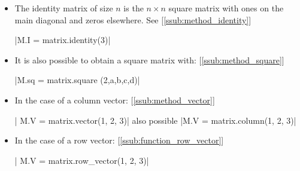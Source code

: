 \begin{itemize}
\begin{tkzexample}[latex=.5\textwidth]
\end{tkzexample}


\item  The identity matrix of size
{$\displaystyle n$} is the {$\displaystyle n\times n$} square matrix with ones on the main diagonal and zeros elsewhere. See  [\ref{ssub:method_identity}]

\begin{mybox}
|M.I = matrix.identity(3)|
\end{mybox}


\begin{tkzexample}[latex=.5\textwidth]
\end{tkzexample}


\item  It is also possible to obtain a square matrix with: [\ref{ssub:method_square}]
  \begin{mybox}
  |M.sq = matrix.square (2,a,b,c,d)|
  \end{mybox}

\begin{tkzexample}[latex=.5\textwidth]
\end{tkzexample}


\item  In the case of a column vector: [\ref{ssub:method_vector}]

  \begin{mybox}
  | M.V = matrix.vector(1, 2, 3)|
  also possible |M.V = matrix.column(1, 2, 3)|
  \end{mybox}


\begin{tkzexample}[latex=.5\textwidth]
\end{tkzexample}


\item  In the case of a row vector: [\ref{ssub:function_row_vector}]

\begin{mybox}
  | M.V = matrix.row_vector(1, 2, 3)|
\end{mybox}


\end{itemize}
